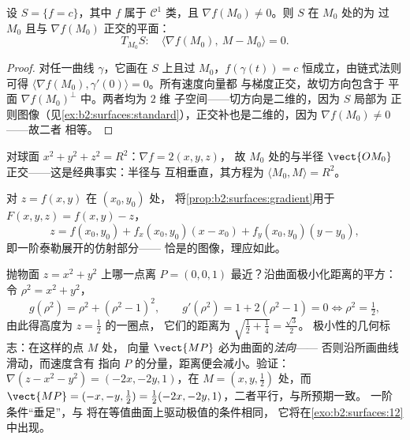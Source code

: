 \begin{proposition}[等值曲面的法向量]\label{prop:b2:surfaces:gradient}
设 $S = \{f = c\}$，其中 $f$ 属于 $\mathcal{C}^1$ 类，且 $\nabla
f(M_0) \neq 0$。则 $S$ 在 $M_0$ 处的为
过 $M_0$ 且与 $\nabla f(M_0)$ 正交的平面：
\[
T_{M_0}S :\quad
\langle \nabla f(M_0),\ M - M_0\rangle = 0 .
\]
\end{proposition}

\begin{proof}
对任一曲线 $\gamma$，它画在 $S$ 上且过 $M_0$，$f(\gamma(t)) =
c$ 恒成立，由链式法则可得 $\langle
\nabla f(M_0), \gamma'(0)\rangle = 0$。所有速度向量都
与梯度正交，故切方向包含于
平面 $\nabla f(M_0)^\perp$ 中。两者均为 $2$ 维
子空间——切方向是二维的，因为 $S$ 局部为
正则图像（见\cref{ex:b2:surfaces:standard}），正交补也是二维的，因为
$\nabla f(M_0) \neq 0$——故二者
相等。
\end{proof}

\begin{example}\label{ex:b2:surfaces:spheretangent}
对球面 $x^2 + y^2 + z^2 = R^2$：$\nabla f = 2(x, y, z)$，
故 $M_0$ 处的与半径
$\vect{OM_0}$ 正交——这是经典事实：半径与
互相垂直，其方程为 $\langle M_0, M\rangle = R^2$。
\end{example}

\begin{example}[图像的切平面]\label{ex:b2:surfaces:graphtangent}
对 $z = f(x, y)$ 在 $(x_0, y_0)$ 处，
将\cref{prop:b2:surfaces:gradient}用于 $F(x,y,z) = f(x,y) - z$，
\[
z = f(x_0, y_0)
+ f_x(x_0, y_0)(x - x_0)
+ f_y(x_0, y_0)(y - y_0) ,
\]
即一阶泰勒展开的仿射部分——
恰是的图像，理应如此。
\end{example}

\begin{example}\label{ex:b2:surfaces:closest}
抛物面 $z = x^2 + y^2$ 上哪一点离
$P = (0, 0, 1)$ 最近？沿曲面极小化距离的平方：
令 $\rho^2 = x^2 + y^2$，
\[
g(\rho^2) = \rho^2 + (\rho^2 - 1)^2,
\qquad
g'(\rho^2) = 1 + 2(\rho^2 - 1) = 0
\iff \rho^2 = \tfrac12 ,
\]
由此得高度为 $z = \frac12$ 的一圈点，
它们的距离为 $\sqrt{\tfrac12 + \tfrac14} = \frac{\sqrt3}2$。
极小性的几何标志：在这样的点 $M$ 处，
向量 $\vect{MP}$ 必为曲面的\emph{法向}——
否则沿所画曲线滑动，而速度含有
指向 $P$ 的分量，距离便会减小。验证：
$\nabla(z - x^2 - y^2) = (-2x, -2y, 1)$，在 $M = (x, y,
\tfrac12)$ 处，而 $\vect{MP} = (-x, -y, \tfrac12) =
\tfrac12(-2x, -2y, 1)$，二者平行，与所预期一致。
一阶条件“垂足”，与
将在等值曲面上驱动极值的条件相同，
它将在\cref{exo:b2:surfaces:12}中出现。
\end{example}

